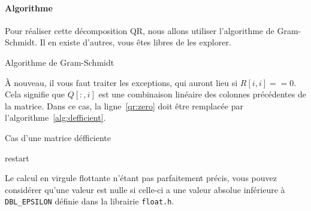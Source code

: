 \documentclass[a4paper, 12pt]{article}
\begin{document}
\paragraph{Algorithme} Pour réaliser cette décomposition QR, nous allons utiliser l'algorithme de Gram-Schmidt. Il en existe d'autres, vous êtes libres de les explorer.

\begin{algorithm}[!htb]
    \caption{Algorithme de Gram-Schmidt}\label{alg:gram_schmidt}
    \begin{algorithmic}[1]
            \label{qr:zero}
                 
            \EndFor{}
        \EndFor{}
    \end{algorithmic}
\end{algorithm}
À nouveau, il vous faut traiter les exceptions, qui auront lieu si $R[i,i] == 0$. Cela signifie que $Q[:,i]$ est une combinaison linéaire des colonnes précédentes de la matrice. Dans ce cas, la ligne~\ref{qr:zero} doit être remplacée par l'algorithme~\ref{alg:defficient}.

\begin{algorithm}[!htb]
    \caption{Cas d'une matrice défficiente}\label{alg:defficient}
    \begin{algorithmic}[1]
        \EndFor{}
         restart
        \Else{}
        \EndIf{}
    \end{algorithmic}
\end{algorithm}

\noindent Le calcul en virgule flottante n'étant pas parfaitement précis, vous pouvez considérer qu'une valeur est nulle si celle-ci a une valeur absolue inférieure à \texttt{DBL\_EPSILON} définie dans la librairie \texttt{float.h}.

\newpage
\end{document}
